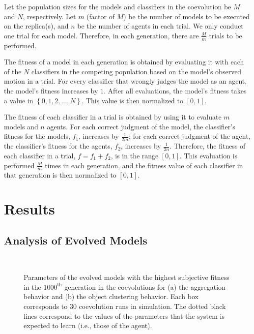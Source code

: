 Let the population sizes for the models and classifiers in the coevolution be $M$ and $N$, respectively. Let $m$ (factor of $M$) be the number of models to be executed on the replica(s), and $n$ be the number of agents in each trial. We only conduct one trial for each model. Therefore, in each generation, there are $\frac{M}{m}$ trials to be performed.

The fitness of a model in each generation is obtained by evaluating it with each of the $N$ classifiers in the competing population based on the model's observed motion in a trial. For every classifier that wrongly judges the model as an agent, the model's fitness increases by $1$. After all evaluations, the model's fitness takes a value in $\left\{0, 1, 2, \dots, N \right\}$. This value is then normalized to $[0, 1]$.

The fitness of each classifier in a trial is obtained by using it to evaluate $m$ models and $n$ agents. For each correct judgment of the model, the classifier's fitness for the models, $f_1$, increases by $\frac{1}{2m}$; for each correct judgment of the agent, the classifier's fitness for the agents, $f_2$, increases by $\frac{1}{2n}$. Therefore, the fitness of each classifier in a trial, $f = f_1 + f_2$, is in the range $[0, 1]$. This evaluation is performed $\frac{M}{m}$ times in each generation, and the fitness value of each classifier in that generation is then normalized to $[0, 1]$.

\section{Results}\label{sec:results_simulation_swarm}

\subsection{Analysis of Evolved Models}\label{sec:analysis_evolved_models_swarm_simulation}

\begin{figure}[!t]%
	\centering
		\\
		\caption{Parameters of the evolved models with the highest subjective fitness in the $1000^\textrm{th}$ generation in the coevolutions for (a) the aggregation behavior and (b) the object clustering behavior. Each box corresponds to 30 coevolution runs in simulation. The dotted black lines correspond to the values of the parameters that the system is expected to learn (i.e., those of the agent).\label{fig:model_parameters_box}}
\end{figure}

